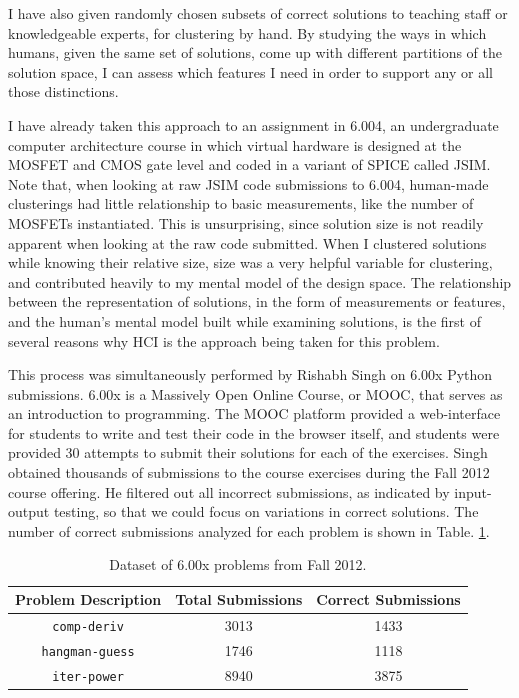 \documentclass[12pt]{article}
\newcommand\tabhead[1]{\small\textbf{#1}}
\newcommand\codevar[1]{\texttt{#1}}
\begin{document}
I have also given randomly chosen subsets of correct solutions to teaching staff or knowledgeable experts, for clustering by hand. By studying the ways in which humans, given the same set of solutions, come up with different partitions of the solution space, I can assess which features I need in order to support any or all those distinctions. 

I have already taken this approach to an assignment in 6.004, an undergraduate computer architecture course in which virtual hardware is designed at the MOSFET and CMOS gate level and coded in a variant of SPICE called JSIM. Note that, when looking at raw JSIM code submissions to 6.004, human-made clusterings had little relationship to basic measurements, like the number of MOSFETs instantiated. This is unsurprising, since solution size is not readily apparent when looking at the raw code submitted. When I clustered solutions while knowing their relative size, size was a very helpful variable for clustering, and contributed heavily to my mental model of the design space. The relationship between the representation of solutions, in the form of measurements or features, and the human's mental model built while examining solutions, is the first of several reasons why HCI is the approach being taken for this problem.

This process was simultaneously performed by Rishabh Singh on 6.00x Python submissions. 6.00x is a Massively Open Online Course, or MOOC, that serves as an introduction to programming. The MOOC platform provided a web-interface for students to write and test their code in the browser itself, and students were provided 30 attempts to submit their solutions for each of the exercises. Singh obtained thousands of submissions to the course exercises during the Fall 2012 course offering. He filtered out all incorrect submissions, as indicated by input-output testing, so that we could focus on variations in correct solutions. The number of correct submissions analyzed for each problem is shown in Table. \ref{table-edx-probs}. 

\begin{table}
\begin{tabular} {|c|c|c|}
\hline
\tabhead{Problem Description} & \tabhead{Total Submissions} & \tabhead {Correct Submissions} \\ \hline
\codevar{comp-deriv} & 3013 & 1433 \\ \hline
\codevar{hangman-guess} & 1746 & 1118 \\ \hline
\codevar{iter-power} & 8940 & 3875 \\ \hline
\end{tabular}
\caption{Dataset of 6.00x problems from Fall 2012.}
\label{table-edx-probs}
\end{table}
\end{document}
